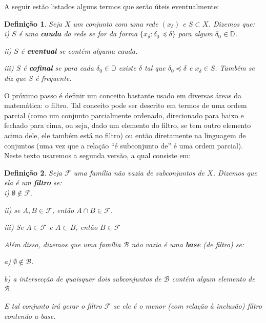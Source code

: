 \documentclass[12pt, a4paper]{article}
\newtheorem{mydef}{Definição}[section]
\theoremstyle{definition}
\begin{document}
A seguir estão listados alguns termos que serão úteis eventualmente: 

\begin{mydef}
	Seja $X$ um conjunto com uma rede  $(x_{\delta })$ e $S\subset X$. Dizemos que:\\
	
	i) $S$ é uma \textbf{cauda} da rede se for da forma $\{ x_{\delta } : \delta_0 \preccurlyeq \delta \}$ para algum $\delta_0 \in \mathbb{D}$. \
	
	ii) $S$ é \textbf{eventual} se contém alguma cauda.\
	
	iii) $S$ é \textbf{cofinal} se para cada $\delta_0 \in \mathbb{D}$ existe  $\delta$ tal que $ \delta_0 \preccurlyeq \delta$ e $x_\delta \in S$. Também se diz que $S$ é frequente.
	
\end{mydef}

O próximo passo é definir um conceito bastante usado em diversas áreas da matemática: o filtro. Tal conceito pode ser descrito em termos de uma ordem parcial (como um conjunto parcialmente ordenado, direcionado para baixo e fechado para cima, ou seja, dado um elemento do filtro, se tem outro elemento acima dele, ele também está no filtro) ou então diretamente na linguagem de conjuntos (uma vez que a relação ``é subconjunto de'' é uma ordem parcial). Neste texto usaremos a segunda versão, a qual consiste em: 

\begin{mydef}
	Seja $\mathcal{F}$ uma família não vazia de subconjuntos de $X$. Dizemos que ela é um \textbf{filtro} se:\\
	
	i) $\emptyset \notin \mathcal{F}$. \
	
	ii) se $A,B \in \mathcal{F}$, então $A\cap B\in \mathcal{F}$. \
	
	iii) Se $A \in \mathcal{F}$ e $A\subset B$, então $B\in \mathcal{F}$\
	
	Além disso, dizemos que uma família $\mathcal{B}$ não vazia é uma \textbf{base} (de filtro) se:\	
	
	a) $\emptyset \notin \mathcal{B}$.\
	
	b) a intersecção de quaisquer dois subconjuntos de $\mathcal{B}$ contém algum elemento de $\mathcal{B}$. \
	
	E tal conjunto irá gerar o filtro $\mathcal{F}$ se ele é o menor (com relação à inclusão) filtro contendo a base.
	
\end{mydef}
\end{document}
